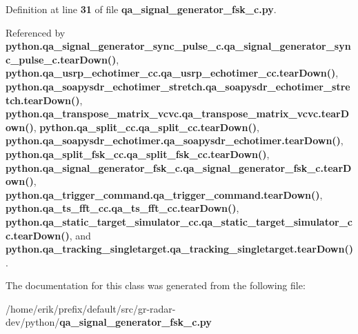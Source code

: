 Definition at line {\bf 31} of file {\bf qa\+\_\+signal\+\_\+generator\+\_\+fsk\+\_\+c.\+py}.



Referenced by {\bf python.\+qa\+\_\+signal\+\_\+generator\+\_\+sync\+\_\+pulse\+\_\+c.\+qa\+\_\+signal\+\_\+generator\+\_\+sync\+\_\+pulse\+\_\+c.\+tear\+Down()}, {\bf python.\+qa\+\_\+usrp\+\_\+echotimer\+\_\+cc.\+qa\+\_\+usrp\+\_\+echotimer\+\_\+cc.\+tear\+Down()}, {\bf python.\+qa\+\_\+soapysdr\+\_\+echotimer\+\_\+stretch.\+qa\+\_\+soapysdr\+\_\+echotimer\+\_\+stretch.\+tear\+Down()}, {\bf python.\+qa\+\_\+transpose\+\_\+matrix\+\_\+vcvc.\+qa\+\_\+transpose\+\_\+matrix\+\_\+vcvc.\+tear\+Down()}, {\bf python.\+qa\+\_\+split\+\_\+cc.\+qa\+\_\+split\+\_\+cc.\+tear\+Down()}, {\bf python.\+qa\+\_\+soapysdr\+\_\+echotimer.\+qa\+\_\+soapysdr\+\_\+echotimer.\+tear\+Down()}, {\bf python.\+qa\+\_\+split\+\_\+fsk\+\_\+cc.\+qa\+\_\+split\+\_\+fsk\+\_\+cc.\+tear\+Down()}, {\bf python.\+qa\+\_\+signal\+\_\+generator\+\_\+fsk\+\_\+c.\+qa\+\_\+signal\+\_\+generator\+\_\+fsk\+\_\+c.\+tear\+Down()}, {\bf python.\+qa\+\_\+trigger\+\_\+command.\+qa\+\_\+trigger\+\_\+command.\+tear\+Down()}, {\bf python.\+qa\+\_\+ts\+\_\+fft\+\_\+cc.\+qa\+\_\+ts\+\_\+fft\+\_\+cc.\+tear\+Down()}, {\bf python.\+qa\+\_\+static\+\_\+target\+\_\+simulator\+\_\+cc.\+qa\+\_\+static\+\_\+target\+\_\+simulator\+\_\+cc.\+tear\+Down()}, and {\bf python.\+qa\+\_\+tracking\+\_\+singletarget.\+qa\+\_\+tracking\+\_\+singletarget.\+tear\+Down()}.



The documentation for this class was generated from the following file\+:\begin{DoxyCompactItemize}
\item 
/home/erik/prefix/default/src/gr-\/radar-\/dev/python/{\bf qa\+\_\+signal\+\_\+generator\+\_\+fsk\+\_\+c.\+py}\end{DoxyCompactItemize}
